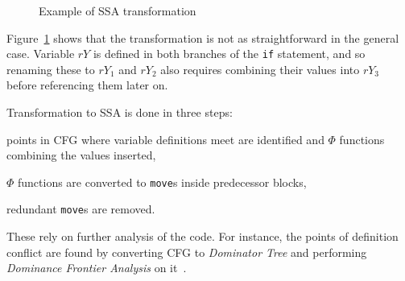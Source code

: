 \documentclass[12pt,twoside,notitlepage]{report}
\begin{document}
\begin{figure}
  \label{figure:Implementation_SSA3}

  \caption{Example of SSA transformation}
  \label{figure:Implementation_SSA}
\end{figure}

Figure~\ref{figure:Implementation_SSA} shows that the transformation is not as straightforward in the general case. Variable $rY$ is defined in both branches of the \texttt{if} statement, and so renaming these to $rY_1$ and $rY_2$ also requires combining their values into $rY_3$ before referencing them later on. 

Transformation to SSA is done in three steps:
\begin{inparaenum}[(i)]
\item points in CFG where variable definitions meet are identified and $\Phi$ functions combining the values inserted,
\item $\Phi$ functions are converted to \texttt{move}s inside predecessor blocks,
\item redundant \texttt{move}s are removed.
\end{inparaenum}
These rely on further analysis of the code. For instance, the points of definition conflict are found by converting CFG to \emph{Dominator Tree} and performing \emph{Dominance Frontier Analysis} on it~\cite{Appel:2003:MCI:599718}.
\end{document}
